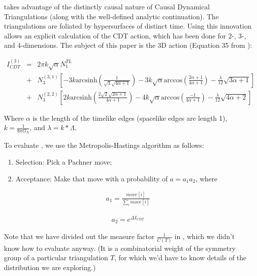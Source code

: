 \documentclass[12pt]{article}
\begin{document}
 takes advantage of the distinctly causal nature of Causal Dynamical Triangulations (along with the well-defined analytic continuation). The triangulations are foliated by hypersurfaces of distinct time. Using this innovation allows an explicit calculation of the CDT action, which has been done for 2-, 3-, and 4-dimensions. The subject of this paper is the 3D action (Equation 35 from \cite{j._ambjorn_dynamically_2001}):

\begin{eqnarray*}
  I_{CDT}^{(3)} &=& 2\pi k\sqrt{\alpha}N_1^{TL} \\
    &+& N_3^{(3,1)}\left[-3k\text{arcsinh}\left(\frac{1}{\sqrt{3}
    \sqrt{4\alpha +1}}\right)-3k\sqrt{\alpha}\text{arccos}\left(\frac{2\alpha+1}
    {4\alpha+1}\right)-\frac{\lambda}{12}\sqrt{3\alpha+1}\right] \\
    &+& N_3^{(2,2)}\left[2k\text{arcsinh}\left(\frac{2\sqrt{2}\sqrt{2\alpha+1}}
    {4\alpha +1}\right)-4k\sqrt{\alpha}\text{arccos}\left(\frac{-1}{4\alpha+1}
    \right)-\frac{\lambda}{12}\sqrt{4\alpha +2}\right]\label{CDT2}
\end{eqnarray*}

Where $\alpha$ is the length of the timelike edges (spacelike edges are length 1), $k=\frac{1}{8\pi G_{N}}$, and $\lambda=k*\Lambda$.

To evaluate , we use the Metropolis-Hastings algorithm as follows:\\[-4ex]
\begin{enumerate}\addtolength{\itemsep}{-1.5ex}
\item Selection: Pick a Pachner move;  
\item Acceptance: Make that move with a probability of $a=a_1a_2$, where
\end{enumerate}
\vspace*{-1ex}

\begin{align}
  a_{1}=\frac{move[i]}{\sum\limits_{i}move[i]}
\end{align}

\begin{align}
  a_{2}=e^{\Delta I_{CDT}}
\end{align}

Note that we have divided out the measure factor $\frac{1}{C(T)}$ in , which we didn't know how to evaluate anyway. (It is a combinatorial weight
of the symmetry group of a particular triangulation $T$, for which we'd have to know details of the distribution we are exploring.)
\end{document}
